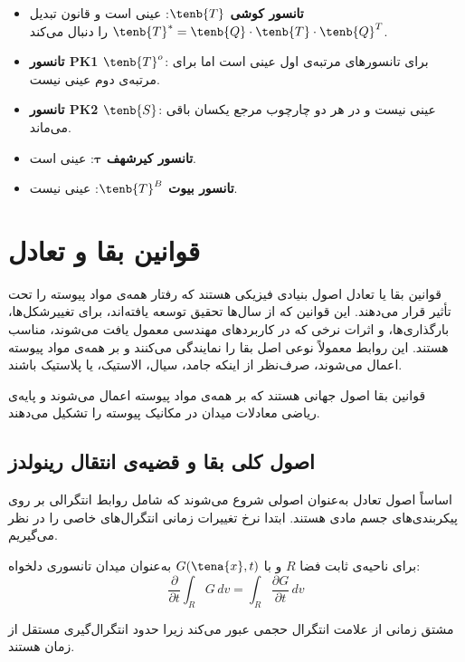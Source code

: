 \begin{itemize}
	\item \textbf{تانسور کوشی $\tenb{T}$}: عینی است و قانون تبدیل $\tenb{T}^* = \tenb{Q} \cdot \tenb{T} \cdot \tenb{Q}^T$ را دنبال می‌کند.
	\item \textbf{تانسور PK1 $\tenb{T}^o$}: برای تانسورهای مرتبه‌ی اول عینی است اما برای مرتبه‌ی دوم عینی نیست.
	\item \textbf{تانسور PK2 $\tenb{S}$}: عینی نیست و در هر دو چارچوب مرجع یکسان باقی می‌ماند.
	\item \textbf{تانسور کیرشهف $\boldsymbol{\tau}$}: عینی است.
	\item \textbf{تانسور بیوت $\tenb{T}^B$}: عینی نیست.
\end{itemize}

\section{قوانین بقا و تعادل}

قوانین بقا یا تعادل اصول بنیادی فیزیکی هستند که رفتار همه‌ی مواد پیوسته را تحت تأثیر قرار می‌دهند. این قوانین که از سال‌ها تحقیق توسعه یافته‌اند، برای تغییرشکل‌ها، بارگذاری‌ها، و اثرات نرخی که در کاربردهای مهندسی معمول یافت می‌شوند، مناسب هستند. این روابط معمولاً نوعی اصل بقا را نمایندگی می‌کنند و بر همه‌ی مواد پیوسته اعمال می‌شوند، صرف‌نظر از اینکه جامد، سیال، الاستیک، یا پلاستیک باشند.

\begin{keypoint}
	قوانین بقا اصول جهانی هستند که بر همه‌ی مواد پیوسته اعمال می‌شوند و پایه‌ی ریاضی معادلات میدان در مکانیک پیوسته را تشکیل می‌دهند.
\end{keypoint}

\subsection{اصول کلی بقا و قضیه‌ی انتقال رینولدز}

اساساً اصول تعادل به‌عنوان اصولی شروع می‌شوند که شامل روابط انتگرالی بر روی پیکربندی‌های جسم مادی هستند. ابتدا نرخ تغییرات زمانی انتگرال‌های خاصی را در نظر می‌گیریم.

برای ناحیه‌ی ثابت فضا $R$ و با $G(\tena{x}, t)$ به‌عنوان میدان تانسوری دلخواه:
\begin{equation}
	\frac{\partial}{\partial t} \int_R G \, dv = \int_R \frac{\partial G}{\partial t} \, dv
\end{equation}

مشتق زمانی از علامت انتگرال حجمی عبور می‌کند زیرا حدود انتگرال‌گیری مستقل از زمان هستند.

